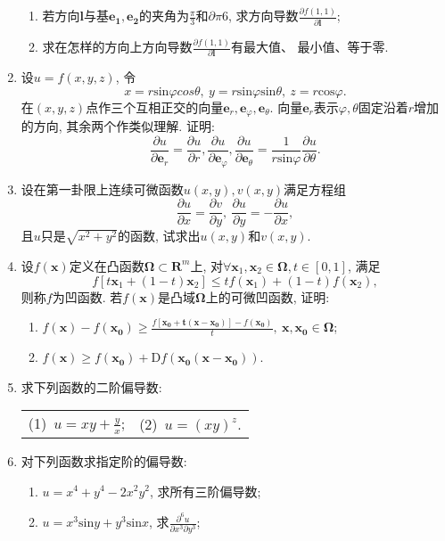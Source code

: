 \begin{enumerate}
\begin{enumerate}
	\item 若方向$\bm{l}$与基$\bm{e_1},\bm{e_2}$的夹角为$\frac{\pi}{3}$和$\partial{\pi}{6}$, 求方向导数$\frac{\partial f(1,1)}{\partial \bm{l}}$;
	\item 求在怎样的方向上方向导数$\frac{\partial f(1,1)}{\partial \bm{l}}$有最大值、 最小值、等于零.
\end{enumerate}
\item 设$u=f(x,y,z)$, 令
$$ x=r\mathrm{sin}\varphi cos\theta,\ y=r\mathrm{sin}\varphi \mathrm{sin}\theta,\ z= r\mathrm{cos}\varphi.$$
在$(x,y,z)$点作三个互相正交的向量$\bm{e}_r,\bm{e}_\varphi,\bm{e}_\theta$. 向量$\bm{e}_r$表示$\varphi, \theta$固定沿着$r$增加的方向, 其余两个作类似理解. 证明:
$$\frac{\partial u}{\partial \bm{e}_r}=\frac{\partial u}{\partial r}, \frac{\partial u}{\partial \bm{e}_\varphi}, \frac{\partial u}{\partial \bm{e}_\theta}=\frac{1}{r\mathrm{sin}\varphi}\frac{\partial u}{\partial \theta}.$$
\item 设在第一卦限上连续可微函数$u(x,y),v(x,y)$满足方程组
$$\frac{\partial u}{\partial x} = \frac{\partial v}{\partial y}, \ \frac{\partial u}{\partial y}=-\frac{\partial u}{\partial x},$$
且$u$只是$\sqrt{x^2+y^2}$的函数, 试求出$u(x,y)$和$v(x,y)$.
\item 设$f(\bm{x})$定义在凸函数$\bm{\Omega} \subset \bm{R}^m$上, 对$\forall \bm{x}_1,\bm{x}_2\in \bm{\Omega} , t\in [0,1]$, 满足$$
f[t\bm{x}_1+(1-t)\bm{x}_2]\le tf(\bm{x}_1) + (1-t)f(\bm{x}_2),$$
则称$f$为凹函数. 若$f(\bm{x})$是凸域$\bm{\Omega}$上的可微凹函数, 证明:
\begin{enumerate}
	\item $f(\bm{x})-f(\bm{x_0})\ge \frac{f[\bm{x_0+t(\bm{x-x_0})}]-f(\bm{x_0})}{t}, \ \bm{x},\bm{x_0}\in \bm{\Omega}$;
	\item $f(\bm{x})\ge f(\bm{x_0})+\mathrm{D}f(\bm{x_0}(\bm{x-x_0}))$.
\end{enumerate}
\item 求下列函数的二阶偏导数:
\begin{table}[H]
	\begin{tabular}{ll}
		(1)\ $u=xy+\frac{y}{x}$;\qquad \qquad \qquad \qquad \qquad &(2)\ $u=(xy)^z$.
	\end{tabular}
\end{table}
\item 对下列函数求指定阶的偏导数:
\begin{enumerate}
	\item $u=x^4+y^4-2x^2y^2$, 求所有三阶偏导数;
	\item $u=x^3\mathrm{sin}y+y^3\mathrm{sin}x$, 求$\frac{\partial^6 u}{\partial x^3 \partial y^3}$;

\end{enumerate}
\end{enumerate}
